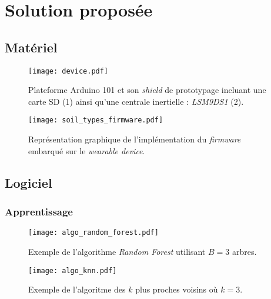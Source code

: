 
\section{Solution proposée}

\subsection{Matériel}

\begin{figure}[H]
	\centering
	\texttt{[image: device.pdf]}
        \caption{Plateforme Arduino 101 et son \textit{shield} de prototypage incluant une carte SD (1) ainsi qu'une centrale inertielle : \textit{LSM9DS1} (2).}
	\label{fig:device}
\end{figure}


\begin{figure}[H]
	\centering
	\texttt{[image: soil\_types\_firmware.pdf]}
        \caption{Représentation graphique de l'implémentation du \textit{firmware} embarqué sur le \textit{wearable device}.}
	\label{fig:soil_types_firmware}
\end{figure}

\subsection{Logiciel}

\subsubsection{Apprentissage}

\begin{figure}[H]
	\centering
	\texttt{[image: algo\_random\_forest.pdf]}
        \caption{Exemple de l'algorithme \textit{Random Forest} utilisant $B=3$ arbres.}
	\label{fig:algo_random_forest}
\end{figure}

\begin{figure}[H]
	\centering
	\texttt{[image: algo\_knn.pdf]}
        \caption{Exemple de l'algoritme des $k$ plus proches voisins où $k=3$.}
	\label{fig:algo_knn}
\end{figure}

